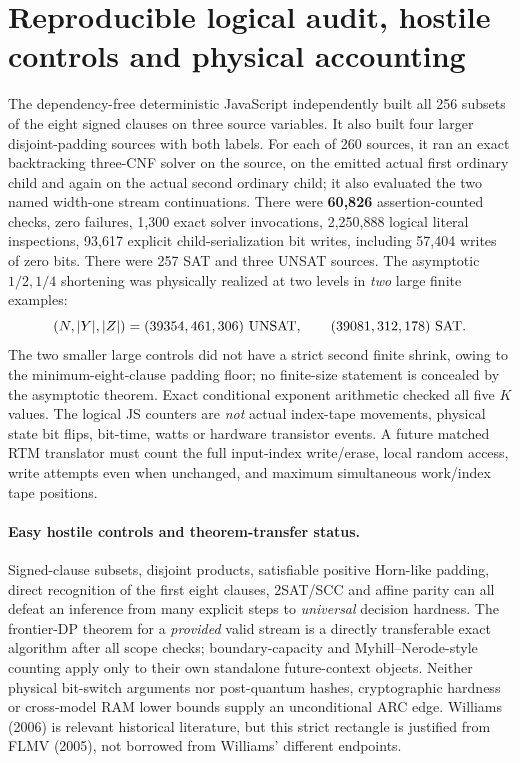 \documentclass[11pt]{article}
\begin{document}
\section{Reproducible logical audit, hostile controls and physical accounting}
The dependency-free deterministic JavaScript independently built
all 256 subsets of the eight signed clauses on three source variables.
It also built four larger disjoint-padding sources with both labels.
For each of 260 sources, it ran an exact backtracking
three-CNF solver on the source, on the emitted actual first ordinary
child and again on the actual second ordinary child; it also evaluated
the two named width-one stream continuations.
There were \textbf{60,826} assertion-counted checks, zero failures,
1,300 exact solver invocations, 2,250,888 logical literal inspections,
93,617 explicit child-serialization bit writes, including 57,404
writes of zero bits. There were 257 SAT and three UNSAT sources.
The asymptotic $1/2,1/4$ shortening was physically realized at
two levels in \emph{two} large finite examples:
\[
  (N,|Y|,|Z|)=(39354,461,306)\ {\rm UNSAT},\qquad
  (39081,312,178)\ {\rm SAT}.
\]
The two smaller large controls did not have a strict second
finite shrink, owing to the minimum-eight-clause padding floor;
no finite-size statement is concealed by the asymptotic theorem.
Exact conditional exponent arithmetic checked all five $K$ values.
The logical JS counters are \emph{not} actual index-tape movements,
physical state bit flips, bit-time, watts or hardware transistor
events. A future matched RTM translator must count the full
input-index write/erase, local random access, write attempts even
when unchanged, and maximum simultaneous work/index tape positions.

\paragraph{Easy hostile controls and theorem-transfer status.}
Signed-clause subsets, disjoint products, satisfiable positive
Horn-like padding, direct recognition of the first eight clauses,
2SAT/SCC and affine parity can all defeat an inference from many
explicit steps to \emph{universal} decision hardness.
The frontier-DP theorem for a \emph{provided} valid stream is a
directly transferable exact algorithm after all scope checks;
boundary-capacity and Myhill--Nerode-style counting apply only
to their own standalone future-context objects. Neither
physical bit-switch arguments nor post-quantum hashes,
cryptographic hardness or cross-model RAM lower bounds
supply an unconditional ARC edge. Williams (2006) is relevant
historical literature, but this strict rectangle is justified
from FLMV (2005), not borrowed from Williams' different endpoints.
\end{document}
